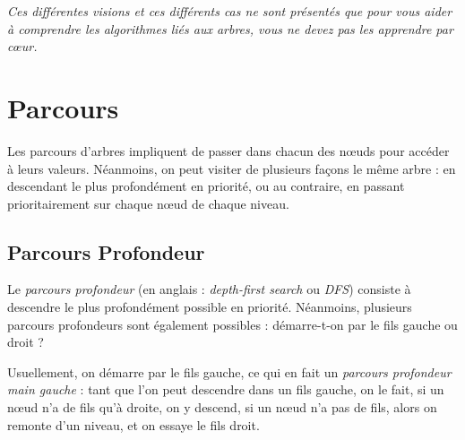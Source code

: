\documentclass[11pt,a4paper]{article}
\begin{document}

\bigskip

\textit{Ces différentes visions et ces différents cas ne sont présentés que pour vous aider à comprendre les algorithmes liés aux arbres, vous ne devez pas les apprendre par cœur.}


\pagebreak

\section{Parcours}

\bigskip

Les parcours d'arbres impliquent de passer dans chacun des nœuds pour accéder à leurs valeurs.
Néanmoins, on peut visiter de plusieurs façons le même arbre : en descendant le plus profondément en priorité, ou au contraire, en passant prioritairement sur chaque nœud de chaque niveau.


\subsection{Parcours Profondeur}

Le \textit{parcours profondeur} (en anglais : \textit{depth-first search} ou \textit{DFS}) consiste à descendre le plus profondément possible en priorité.
Néanmoins, plusieurs parcours profondeurs sont également possibles : démarre-t-on par le fils gauche ou droit ?

Usuellement, on démarre par le fils gauche, ce qui en fait un \textit{parcours profondeur main gauche} : tant que l'on peut descendre dans un fils gauche, on le fait, si un nœud n'a de fils qu'à droite, on y descend, si un nœud n'a pas de fils, alors on remonte d'un niveau, et on essaye le fils droit.

\medskip
\end{document}
